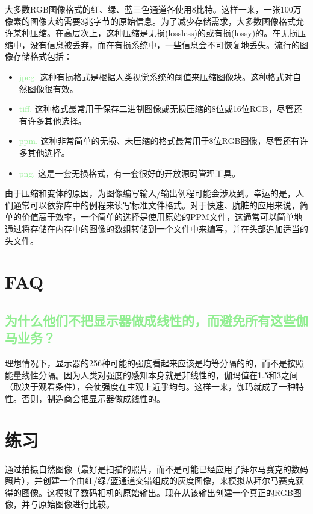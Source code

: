 \documentclass[lang=cn,12pt]{elegantbook}
\begin{document}
大多数RGB图像格式的红、绿、蓝三色通道各使用8比特。这样一来，一张100万像素的图像大约需要3兆字节的原始信息。为了减少存储需求，大多数图像格式允许某种压缩。在高层次上，这种压缩是无损(lossless)的或有损(lossy)的。在无损压缩中，没有信息被丢弃，而在有损系统中，一些信息会不可恢复地丢失。流行的图像存储格式包括：

\begin{itemize}
  \item \textcolor{lightgreen}{jpeg.} 这种有损格式是根据人类视觉系统的阈值来压缩图像块。这种格式对自然图像很有效。
  \item \textcolor{lightgreen}{tiff.} 这种格式最常用于保存二进制图像或无损压缩的8位或16位RGB，尽管还有许多其他选择。
  \item \textcolor{lightgreen}{ppm.} 这种非常简单的无损、未压缩的格式最常用于8位RGB图像，尽管还有许多其他选择。
  \item \textcolor{lightgreen}{png.} 这是一套无损格式，有一套很好的开放源码管理工具。
\end{itemize}

由于压缩和变体的原因，为图像编写输入/输出例程可能会涉及到。幸运的是，人们通常可以依靠库中的例程来读写标准文件格式。对于快速、肮脏的应用来说，简单的价值高于效率，一个简单的选择是使用原始的PPM文件，这通常可以简单地通过将存储在内存中的图像的数组转储到一个文件中来编写，并在头部追加适当的头文件。

\section{FAQ}

\subsection{\textcolor{lightgreen}{为什么他们不把显示器做成线性的，而避免所有这些伽马业务？}}

理想情况下，显示器的256种可能的强度看起来应该是均等分隔的的，而不是按照能量线性分隔。因为人类对强度的感知本身就是非线性的，伽玛值在1.5和3之间（取决于观看条件），会使强度在主观上近乎均匀。这样一来，伽玛就成了一种特性。否则，制造商会把显示器做成线性的。

\section{练习}

通过拍摄自然图像（最好是扫描的照片，而不是可能已经应用了拜尔马赛克的数码照片），并创建一个由红/绿/蓝通道交错组成的灰度图像，来模拟从拜尔马赛克获得的图像。这模拟了数码相机的原始输出。现在从该输出创建一个真正的RGB图像，并与原始图像进行比较。
\end{document}
